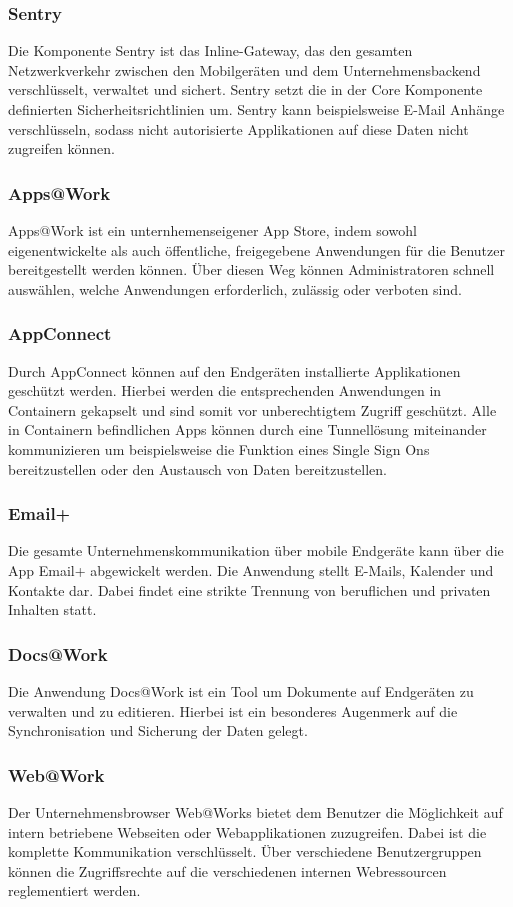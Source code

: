 \subsubsection {Sentry}
Die Komponente Sentry ist das Inline-Gateway, das den gesamten Netzwerkverkehr zwischen den Mobilgeräten und dem Unternehmensbackend verschlüsselt, verwaltet und sichert. Sentry setzt die in der Core Komponente definierten Sicherheitsrichtlinien um. Sentry kann beispielsweise E-Mail Anhänge verschlüsseln, sodass nicht autorisierte Applikationen auf diese Daten nicht zugreifen können. 

\subsubsection {Apps@Work}
Apps@Work ist ein unternhemenseigener App Store, indem sowohl eigenentwickelte als auch öffentliche, freigegebene Anwendungen für die Benutzer bereitgestellt werden können. Über diesen Weg können Administratoren schnell auswählen, welche Anwendungen erforderlich, zulässig oder verboten sind. 
\subsubsection {AppConnect}
Durch AppConnect können auf den Endgeräten installierte Applikationen geschützt werden. Hierbei werden die entsprechenden Anwendungen in Containern gekapselt und sind somit vor unberechtigtem Zugriff geschützt. Alle in Containern befindlichen Apps können durch eine Tunnellösung miteinander kommunizieren um beispielsweise die Funktion eines Single Sign Ons bereitzustellen oder den Austausch von Daten bereitzustellen. 
\subsubsection {Email+}
Die gesamte Unternehmenskommunikation über mobile Endgeräte kann über die App Email+ abgewickelt werden. Die Anwendung stellt E-Mails, Kalender und Kontakte dar. Dabei findet eine strikte Trennung von beruflichen und privaten Inhalten statt. 
\subsubsection {Docs@Work}
Die Anwendung Docs@Work ist ein Tool um Dokumente auf Endgeräten zu verwalten und zu editieren. Hierbei ist ein besonderes Augenmerk auf die Synchronisation und Sicherung der Daten gelegt. 
\subsubsection {Web@Work}
Der Unternehmensbrowser Web@Works bietet dem Benutzer die Möglichkeit auf intern betriebene Webseiten oder Webapplikationen zuzugreifen.  Dabei ist die komplette Kommunikation verschlüsselt. Über verschiedene Benutzergruppen können die  Zugriffsrechte  auf die verschiedenen internen Webressourcen reglementiert werden. 
